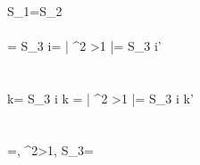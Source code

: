 \\
S_1=S_2
\\\\
{\omega}= S_3  i\omega = \left | \beta^2 \textgreater 1 \right |= S_3 \frac {\beta}{\left | \beta \right |} \sqrt {}i\omega'
\\
\\
\\
{k}= S_3  i k = \left | \beta^2 \textgreater 1 \right |= S_3 \frac {\beta}{\left | \beta \right |}\sqrt {}i k'
\\
\\
\\
\beta=, \beta^2\textgreater 1, S_3= 
